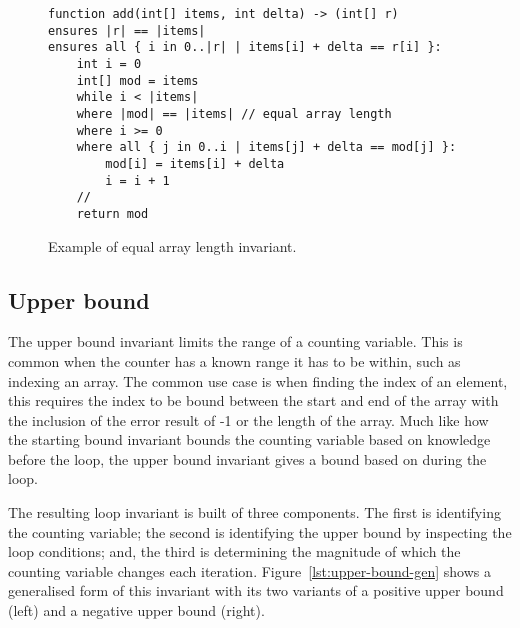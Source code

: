 \begin{figure}[ht]
\begin{lstlisting}
function add(int[] items, int delta) -> (int[] r)
ensures |r| == |items|
ensures all { i in 0..|r| | items[i] + delta == r[i] }:
    int i = 0
    int[] mod = items
    while i < |items|
    where |mod| == |items| // equal array length
    where i >= 0
    where all { j in 0..i | items[j] + delta == mod[j] }:
        mod[i] = items[i] + delta
        i = i + 1
    //
    return mod
\end{lstlisting}
\caption{Example of equal array length invariant.}
\label{lst:array-length-eq}
\end{figure}

\subsection{Upper bound}

The upper bound invariant limits the range of a counting variable.
This is common when the counter has a known range it has to be within,
such as indexing an array.
The common use case is when finding the index of an element,
this requires the index to be bound between the start and end of the
array with the inclusion of the error result of -1 or the length of the array.
Much like how the starting bound invariant bounds
the counting variable based on knowledge before the loop,
the upper bound invariant gives a bound based on during the loop.

The resulting loop invariant is built of three components.
The first is identifying the counting variable; 
the second is identifying the upper bound by inspecting the
loop conditions; and, the third is determining the 
magnitude of which the counting variable changes each iteration.
Figure~\ref{lst:upper-bound-gen} shows a generalised form
of this invariant with its two variants of a positive 
upper bound (left) and a negative upper bound (right).

